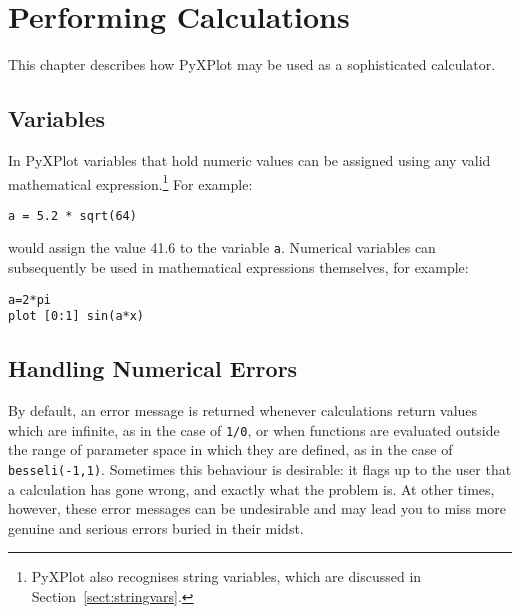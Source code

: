 %
%
%
%
%



\chapter{Performing Calculations}

This chapter describes how PyXPlot may be used as a sophisticated calculator.

\section{Variables}

In PyXPlot variables that hold numeric values can be assigned using any valid
mathematical expression.\footnote{PyXPlot also recognises string variables,
which are discussed in Section~\ref{sect:stringvars}.}  For example:

\begin{verbatim}
a = 5.2 * sqrt(64)
\end{verbatim}

\noindent would assign the value 41.6 to the variable {\tt a}.  Numerical variables can
subsequently be used in mathematical expressions themselves, for example:

\begin{verbatim}
a=2*pi
plot [0:1] sin(a*x)
\end{verbatim}

\section{Handling Numerical Errors}
\label{sec:num_errs}

By default, an error message is returned whenever calculations return values
which are infinite, as in the case of {\tt 1/0}, or when functions are
evaluated outside the range of parameter space in which they are defined, as in
the case of {\tt besseli(-1,1)}.  Sometimes this behaviour is desirable: it
flags up to the user that a calculation has gone wrong, and exactly what the
problem is.  At other times, however, these error messages can be undesirable
and may lead you to miss more genuine and serious errors buried in their midst.

